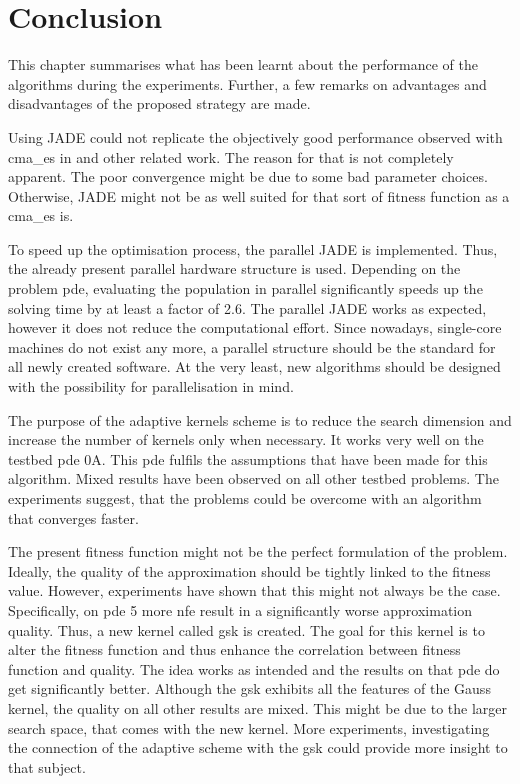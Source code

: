 \documentclass[./\jobname.tex]{subfiles}
\begin{document}
\section{Conclusion}
This chapter summarises what has been learnt about the performance of the algorithms during the experiments. Further, a few remarks on advantages and disadvantages of the proposed strategy are made. 

Using JADE could not replicate the objectively good performance observed with \gls{cma_es} in \cite{chaquet_using_2019} and other related work. The reason for that is not completely apparent. The poor convergence might be due to some bad parameter choices. Otherwise, JADE might not be as well suited for that sort of fitness function as a \gls{cma_es} is. 

To speed up the optimisation process, the parallel JADE is implemented. Thus, the already present parallel hardware structure is used. Depending on the problem \gls{pde}, evaluating the population in parallel significantly speeds up the solving time by at least a factor of 2.6. The parallel JADE works as expected, however it does not reduce the computational effort. Since nowadays, single-core machines do not exist any more, a parallel structure should be the standard for all newly created software. At the very least, new algorithms should be designed with the possibility for parallelisation in mind. 

The purpose of the adaptive kernels scheme is to reduce the search dimension and increase the number of kernels only when necessary. It works very well on the testbed \gls{pde} 0A. This \gls{pde} fulfils the assumptions that have been made for this algorithm. Mixed results have been observed on all other testbed problems. The experiments suggest, that the problems could be overcome with an algorithm that converges faster. 

The present fitness function might not be the perfect formulation of the problem. Ideally, the quality of the approximation should be tightly linked to the fitness value. However, experiments have shown that this might not always be the case. Specifically, on \gls{pde} 5 more \gls{nfe} result in a significantly worse approximation quality. Thus, a new kernel called \gls{gsk} is created. The goal for this kernel is to alter the fitness function and thus enhance the correlation between fitness function and quality. The idea works as intended and the results on that \gls{pde} do get significantly better. Although the \gls{gsk} exhibits all the features of the Gauss kernel, the quality on all other results are mixed. This might be due to the larger search space, that comes with the new kernel. More experiments, investigating the connection of the adaptive scheme with the \gls{gsk} could provide more insight to that subject.
\end{document}
